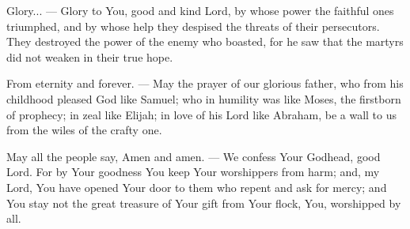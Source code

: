 \documentclass[12pt,twoside,a5paper]{article}
\begin{document}
\begin{halfparskip}
  Glory... --- Glory to You, good and kind Lord, by whose power the faithful ones triumphed, and by whose help they despised the threats of their persecutors. They destroyed the power of the enemy who boasted, for he saw that the martyrs did not weaken in their true hope.

  From eternity and forever. --- May the prayer of our glorious father, who from his childhood pleased God like Samuel; who in humility was like Moses, the firstborn of prophecy; in zeal like Elijah; in love of his Lord like Abraham, be a wall to us from the wiles of the crafty one.

  May all the people say, Amen and amen. --- We confess Your Godhead, good Lord. For by Your goodness You keep Your worshippers from harm; and, my Lord, You have opened Your door to them who repent and ask for mercy; and You stay not the great treasure of Your gift from Your flock, You, worshipped by all.
\end{halfparskip}

\end{document}
